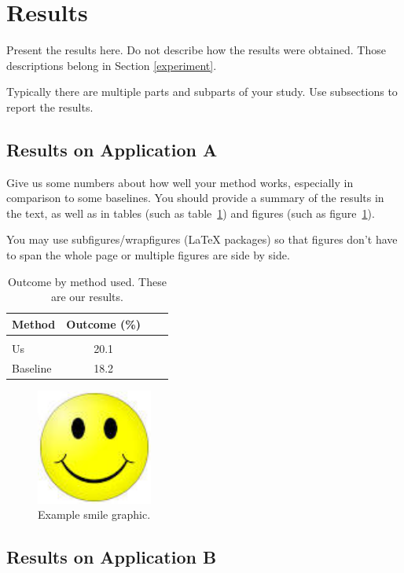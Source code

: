 \documentclass[twoside,11pt]{article}
\begin{document}
\section{Results} \label{results}

Present the results here.
Do not describe how the results were obtained.
Those descriptions belong in Section \ref{experiment}.

Typically there are multiple parts and subparts of your study.
Use subsections to report the results.

\subsection{Results on Application A} 

Give us some numbers about how well your method works, especially in comparison to some baselines.
You should provide a summary of the results in the text, as well as in tables (such as table~\ref{tab:example}) and figures (such as figure~\ref{fig:example}).  

You may use subfigures/wrapfigures (LaTeX packages) so that figures don't have to span the whole page or multiple figures are side by side.

\begin{table}[htbp]
  \centering 
  \begin{tabular}{lclc} 
    Method & Outcome (\%) \\ 
    \hline \\[-11pt]
    Us & 20.1 \\ 
    Baseline & 18.2 \\ \hline 
  \end{tabular}
  \label{tab:example} 
    \caption{Outcome by method used. These are our results.} 
\end{table}

\begin{figure}[htbp]
  \centering 
  \includegraphics[width=1.5in]{smile.jpeg} 
  \caption{Example smile graphic.}
  \label{fig:example} 
\end{figure} 

\subsection{Results on Application B} 
\end{document}
